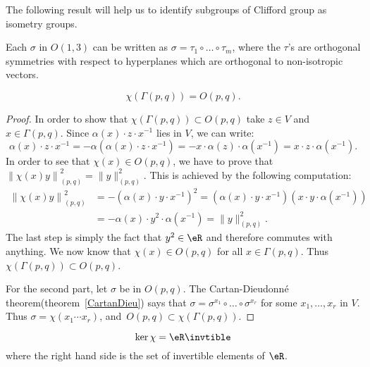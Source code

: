 The following result will help us to identify subgroups of Clifford group as isometry groups.
\begin{theorem}
	Each $\sigma$ in $O(1,3)$ can be written as
	\hbox{$\sigma=\tau_1\circ\ldots\circ\tau_m$}, where the $\tau$'s are orthogonal symmetries with respect to hyperplanes which are orthogonal to non-isotropic vectors.
	\label{CartanDieu}
\end{theorem}

\begin{proposition}
	\[
		\chi(\Gamma(p,q))=O(p,q).
	\]
	\label{prop1001t1}
\end{proposition}

\begin{proof}
	In order to show that $\chi(\Gamma(p,q))\subset O(p,q)$ take $z\in V$ and $x\in\Gamma(p,q)$. Since $\alpha(x)\cdot z\cdot x^{-1}$ lies in $V$, we can write:
	\[
		\alpha(x)\cdot z\cdot x^{-1}=-\alpha\left(\alpha(x)\cdot z\cdot x^{-1}\right)
		=-x\cdot\alpha(z)\cdot\alpha(x^{-1})=x\cdot z\cdot\alpha(x^{-1}).
	\]
	In order to see that $\chi(x)\in O(p,q)$, we have to prove that $\left\|\chi(x)y\right\|_{(p,q)}^2=\|y\|_{(p,q)}^2$. This is achieved by the following computation:
	\begin{equation}
		\begin{split}
			\left\|\chi(x)y\right\|_{(p,q)}^2 & =-\left(\alpha(x)\cdot y\cdot x^{-1}\right)^2
			=\left(\alpha(x)\cdot y\cdot x^{-1}\right)\left(x\cdot y\cdot\alpha(x^{-1})\right) \\
			                                  & =-\alpha(x)\cdot y^2\cdot\alpha(x^{-1})
			=\|y\|^2_{(p,q)}.
		\end{split}
	\end{equation}
	The last step is simply the fact that $y^2\in\eR$ and therefore commutes with anything. We now know that $\chi(x)\in O(p,q)$ for all $x\in\Gamma(p,q)$. Thus $\chi(\Gamma(p,q))\subset O(p,q)$.

	For the second part, let $\sigma$ be in $O(p,q)$. The Cartan-Dieudonné theorem(theorem~\ref{CartanDieu}) says that $\sigma=\sigma^{x_1}\circ\ldots\circ\sigma^{x_r}$ for some $x_1,\ldots, x_r$ in $V$. Thus $\sigma=\chi(x_1\cdots x_r)$, \hbox{and $O(p,q)\subset\chi(\Gamma(p,q))$}.
\end{proof}

\begin{proposition}
	\begin{equation}
		\ker\chi=\eR\invtible
	\end{equation}
	where the right hand side is the set of invertible elements of $\eR$.
	\label{prop1001p1}
\end{proposition}

